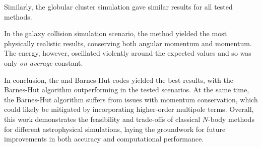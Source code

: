 Similarly, the globular cluster simulation gave similar results for all tested methods.

In the galaxy collision simulation scenario, the \PThreeM{} method yielded the most physically realistic results, conserving both angular momentum and momentum.
The energy, however, oscillated violently around the expected values and so was only \textit{on average} constant.

In conclusion, the \PThreeM{} and Barnes-Hut codes yielded the best results, with the Barnes-Hut algorithm outperforming \PThreeM{} in the tested scenarios.
At the same time, the Barnes-Hut algorithm suffers from issues with momentum conservation, which could likely be mitigated by incorporating higher-order multipole terms.
Overall, this work demonstrates the feasibility and trade-offs of classical $N$-body methods for different astrophysical simulations, laying the groundwork for future improvements in both accuracy and computational performance.
